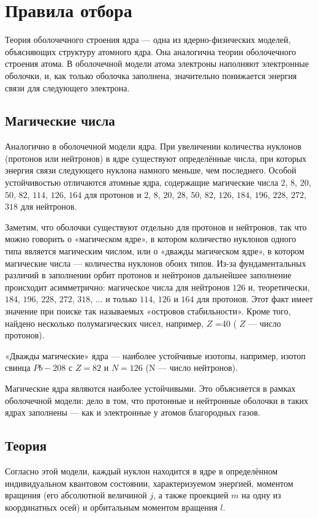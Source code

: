 \documentclass[a4paper,14pt,russian]{article}
\begin{document}
\newpage

\section{Правила отбора}

Теория оболочечного строения ядра — одна из ядерно-физических моделей, объясняющих структуру атомного ядра. Она аналогична теории оболочечного строения атома. В оболочечной модели атома электроны наполняют электронные оболочки, и, как только оболочка заполнена, значительно понижается энергия связи для следующего электрона.

\subsection{Магические числа}
Аналогично в оболочечной модели ядра. При увеличении количества нуклонов (протонов или нейтронов) в ядре существуют определённые числа, при которых энергия связи следующего нуклона намного меньше, чем последнего. Особой устойчивостью отличаются атомные ядра, содержащие магические числа $2$, $8$, $20$, $50$, $82$, $114$, $126$, $164$ для протонов и $2$, $8$, $20$, $28$, $50$, $82$, $126$, $184$, $196$, $228$, $272$, $318$ для нейтронов.

Заметим, что оболочки существуют отдельно для протонов и нейтронов, так что можно говорить о «магическом ядре», в котором количество нуклонов одного типа является магическим числом, или о «дважды магическом ядре», в котором магические числа — количества нуклонов обоих типов. Из-за фундаментальных различий в заполнении орбит протонов и нейтронов дальнейшее заполнение происходит асимметрично: магическое числа для нейтронов $126$ и, теоретически, $184$, $196$, $228$, $272$, $318$, ... и только $114$, $126$ и $164$ для протонов. Этот факт имеет значение при поиске так называемых «островов стабильности». Кроме того, найдено несколько полумагических чисел, например, 
$
Z
$
=40 (
$
Z
$
— число протонов).

«Дважды магические» ядра — наиболее устойчивые изотопы, например, изотоп свинца $Pb-208$ с $Z=82$ и $N=126$ (N — число нейтронов).

Магические ядра являются наиболее устойчивыми. Это объясняется в рамках оболочечной модели: дело в том, что протонные и нейтронные оболочки в таких ядрах заполнены — как и электронные у атомов благородных газов.

\subsection{Теория}
Согласно этой модели, каждый нуклон находится в ядре в определённом индивидуальном квантовом состоянии, характеризуемом энергией, моментом вращения (его абсолютной величиной $j$, а также проекцией $m$ на одну из координатных осей) и орбитальным моментом вращения $l$.
\end{document}
